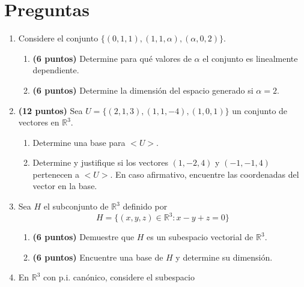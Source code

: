 \documentclass[a4paper]{article}
\begin{document}
\section*{Preguntas}
\begin{enumerate}


    \item Considere el conjunto $\{ ( 0 , 1 , 1 ), ( 1 , 1 , \alpha) , (\alpha , 0 , 2 )\}$.
    \begin{enumerate}
        \item {\bf (6 puntos)}  Determine para qu\'e valores de $\alpha$ el conjunto es li\-neal\-mente dependiente.
        \item {\bf (6 puntos)} 
 Determine la dimensión del espacio generado si $\alpha=2$.
    \end{enumerate}
   
    
\newpage

    \item {\bf (12 puntos)} Sea $U=\{(2,1,3),(1,1,-4),(1,0,1)\}$ un conjunto de vectores en $\mathbb{R}^3$.
    \begin{enumerate}
    \item Determine una base para $<U>$.
        \item Determine y justifique si los vectores $(1,-2,4)$ y $(-1,-1,4)$ pertenecen a $<U>$. En caso afirmativo, encuentre las coordenadas del vector en la base.
    \end{enumerate}







\newpage

    \item Sea $H$ el subconjunto de $\mathbb{R}^3$ definido por
\[H=\{(x,y,z)\in\mathbb{R}^3\colon x-y+z=0  \}\]

\begin{enumerate}
    \item {\bf (6 puntos)} Demuestre que $H$ es un subespacio vectorial de $\mathbb{R}^3$.
    \item {\bf (6 puntos)} Encuentre una base de $H$ y determine su dimensión.

\end{enumerate}

    \newpage
    \item En $\mathbb{ R}^3$ con p.i. canónico, considere el subespacio


\end{enumerate}
\end{document}
